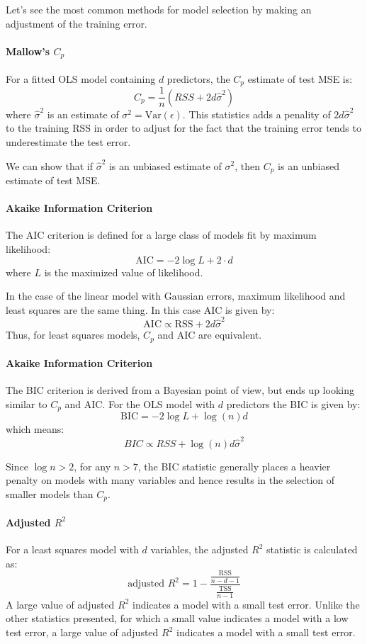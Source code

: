 Let's see the most common methods for model selection by making an adjustment of the training error.
\paragraph*{Mallow's $C_p$}
For a fitted OLS model containing $d$ predictors, the $C_p$ estimate of test MSE is:
\[
    C_p = \frac{1}{n} \left(RSS + 2d\hat{\sigma}^2\right)
\]
where $\hat{\sigma}^2$ is an estimate of $\sigma^2 = \text{Var}(\epsilon)$. This statistics adds a penality of $2d\hat{\sigma}^2$ to the training RSS in order to adjust for the fact that the training error tends to underestimate the test error.

We can show that if $\hat{\sigma}^2$ is an unbiased estimate of $\sigma^2$, then $C_p$ is an unbiased estimate of test MSE.

\paragraph*{Akaike Information Criterion}
The AIC criterion is defined for a large class of models fit by maximum likelihood:
\[
    \text{AIC} = -2\log L + 2 \cdot d
\]
where $L$ is the maximized value of likelihood.

In the case of the linear model with Gaussian errors, maximum likelihood and least squares are the same thing. In this case AIC is given by:
\[
    \text{AIC} \propto \text{RSS} + 2d\hat{\sigma}^2
\]
Thus, for least squares models, $C_p$ and AIC are equivalent.

\paragraph*{Akaike Information Criterion}
The BIC criterion is derived from a Bayesian point of view, but ends up looking similar to $C_p$ and AIC. For the OLS model with $d$ predictors the BIC is given by:
\[
    \text{BIC} = - 2 \log L + \log(n) d
\]
which means:
\[
    BIC \propto RSS + \log (n)d \hat{\sigma}^2
\]

Since $\log n > 2$, for any $n > 7$, the BIC statistic generally places a heavier penalty on models with many variables and hence results in the selection of smaller models than $C_p$.

\paragraph*{Adjusted $R^2$}
For a least squares model with $d$ variables, the adjusted $R^2$ statistic is calculated as:
\[
    \text{adjusted } R^2 = 1 - \frac{\frac{\text{RSS}}{n-d-1}}{\frac{\text{TSS}}{n-1}}
\]
A large value of adjusted $R^2$ indicates a model with a small test error.
Unlike the other statistics presented, for which a small value indicates a model with a low test error, a large value of adjusted $R^2$ indicates a model with a small test error.

